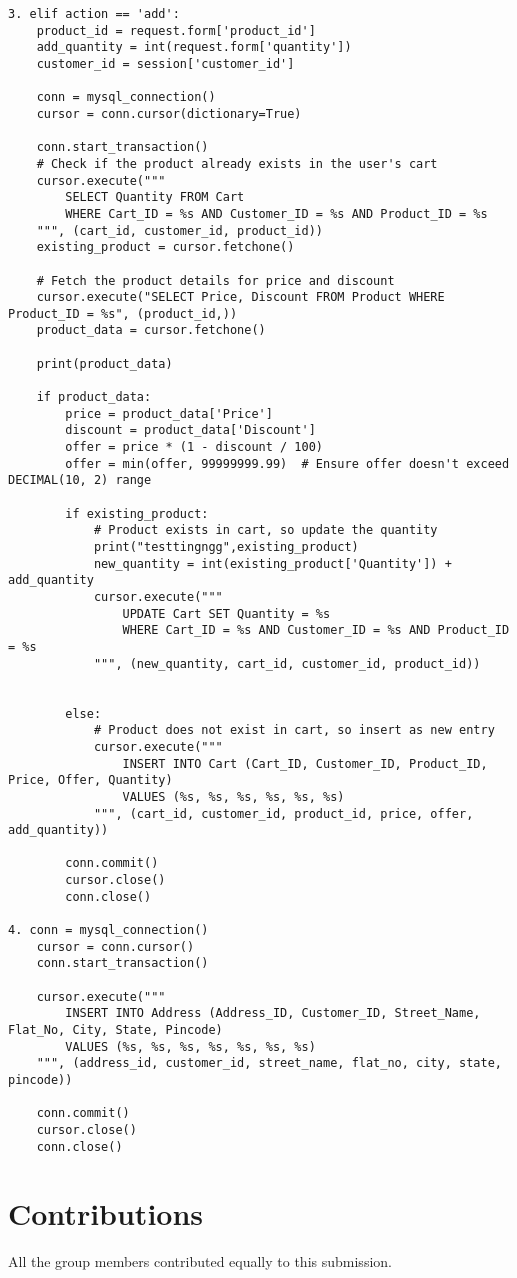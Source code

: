 \documentclass[12pt]{article}
\begin{document}
\begin{verbatim}
3. elif action == 'add':
    product_id = request.form['product_id']
    add_quantity = int(request.form['quantity'])
    customer_id = session['customer_id']

    conn = mysql_connection()
    cursor = conn.cursor(dictionary=True)

    conn.start_transaction()
    # Check if the product already exists in the user's cart
    cursor.execute("""
        SELECT Quantity FROM Cart 
        WHERE Cart_ID = %s AND Customer_ID = %s AND Product_ID = %s
    """, (cart_id, customer_id, product_id))
    existing_product = cursor.fetchone()

    # Fetch the product details for price and discount
    cursor.execute("SELECT Price, Discount FROM Product WHERE Product_ID = %s", (product_id,))
    product_data = cursor.fetchone()
    
    print(product_data)

    if product_data:
        price = product_data['Price']
        discount = product_data['Discount']
        offer = price * (1 - discount / 100)
        offer = min(offer, 99999999.99)  # Ensure offer doesn't exceed DECIMAL(10, 2) range

        if existing_product:
            # Product exists in cart, so update the quantity
            print("testtingngg",existing_product)
            new_quantity = int(existing_product['Quantity']) + add_quantity
            cursor.execute("""
                UPDATE Cart SET Quantity = %s
                WHERE Cart_ID = %s AND Customer_ID = %s AND Product_ID = %s
            """, (new_quantity, cart_id, customer_id, product_id))
            
            
        else:
            # Product does not exist in cart, so insert as new entry
            cursor.execute("""
                INSERT INTO Cart (Cart_ID, Customer_ID, Product_ID, Price, Offer, Quantity) 
                VALUES (%s, %s, %s, %s, %s, %s)
            """, (cart_id, customer_id, product_id, price, offer, add_quantity))

        conn.commit()
        cursor.close()
        conn.close()

4. conn = mysql_connection()
    cursor = conn.cursor()
    conn.start_transaction()

    cursor.execute("""
        INSERT INTO Address (Address_ID, Customer_ID, Street_Name, Flat_No, City, State, Pincode) 
        VALUES (%s, %s, %s, %s, %s, %s, %s)
    """, (address_id, customer_id, street_name, flat_no, city, state, pincode))
    
    conn.commit()
    cursor.close()
    conn.close()

\end{verbatim}

\section*{Contributions}

All the group members contributed equally to this submission.
\end{document}
